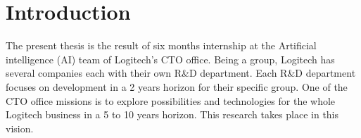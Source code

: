 \newpage
\section{Introduction}



The present thesis is the result of six months internship at the Artificial intelligence (AI) team of Logitech's CTO office. Being a group, Logitech has several companies each with their own R\&D department. Each R\&D department focuses on development in a 2 years horizon for their specific group. One of the CTO office missions is to explore possibilities and technologies for the whole Logitech business in a 5 to 10 years horizon. This research takes place in this vision.





% 
% 

